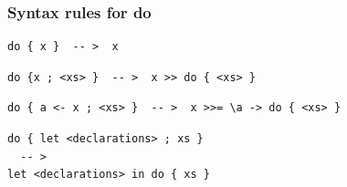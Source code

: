 \documentclass{beamer}
\begin{document}
\begin{frame}[fragile]
\frametitle{Syntax rules for do}

\begin{verbatim}
do { x }  -- >  x
\end{verbatim}

\begin{verbatim}
do {x ; <xs> }  -- >  x >> do { <xs> }
\end{verbatim}

\begin{verbatim}
do { a <- x ; <xs> }  -- >  x >>= \a -> do { <xs> }
\end{verbatim}

\begin{verbatim}
do { let <declarations> ; xs }
  -- >
let <declarations> in do { xs }
\end{verbatim}


\end{frame}
   
\end{document}
